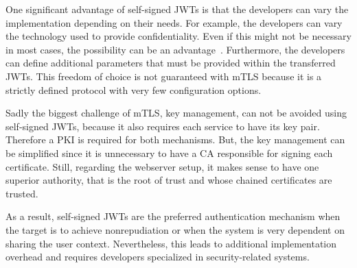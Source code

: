 One significant advantage of self-signed JWTs is that the developers can vary the implementation depending on their needs.
For example, the developers can vary the technology used to provide confidentiality. 
Even if this might not be necessary in most cases, the possibility can be an advantage~\cite{dias2020microservices}.
Furthermore, the developers can define additional parameters that must be provided within the transferred JWTs.
This freedom of choice is not guaranteed with mTLS because it is a strictly defined protocol with very few configuration options.

Sadly the biggest challenge of mTLS, key management, can not be avoided using self-signed JWTs, because it also requires each service to have its key pair.
Therefore a PKI is required for both mechanisms.
But, the key management can be simplified since it is unnecessary to have a CA responsible for signing each certificate.
Still, regarding the webserver setup, it makes sense to have one superior authority, that is the root of trust and whose chained certificates are trusted.

As a result, self-signed JWTs are the preferred authentication mechanism when the target is to achieve nonrepudiation or when the system is very dependent on sharing the user context.
Nevertheless, this leads to additional implementation overhead and requires developers specialized in security-related systems.
